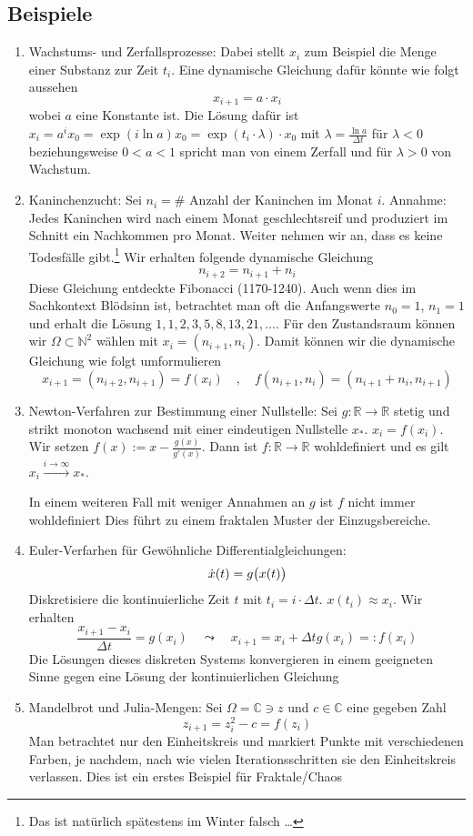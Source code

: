 \subsection*{Beispiele} %
\label{sub:beispiele}
\begin{enumerate}[(1)]
	\item Wachstums- und Zerfallsprozesse: Dabei stellt $x_i$ zum Beispiel die Menge einer Substanz zur Zeit $t_i$. Eine dynamische Gleichung dafür könnte wie folgt aussehen
	\[
		x_{i+1} = a \cdot x_i
	\]
	wobei $a$ eine Konstante ist. Die Lösung dafür ist $x_i = a^i x_0 = \exp(i \ln a) x_0 = \exp(t_i \cdot \lambda) \cdot x_0$ mit $\lambda= \frac{\ln a}{\Delta t}$ für 
	$\lambda <0$ beziehungsweise $0 < a < 1$ spricht man von einem Zerfall und für $\lambda>0$ von Wachstum.
	\item Kaninchenzucht: Sei $n_i = \#$ Anzahl der Kaninchen im Monat $i$. Annahme: Jedes Kaninchen wird nach einem Monat geschlechtsreif und produziert im Schnitt ein 
	Nachkommen pro Monat. Weiter nehmen wir an, dass es keine Todesfälle gibt.\footnote{Das ist natürlich spätestens im Winter falsch \ldots} Wir erhalten folgende 
	dynamische Gleichung
	\[
		n_{i+2} = n_{i+1} + n_i
	\]
	Diese Gleichung entdeckte Fibonacci (1170-1240). Auch wenn dies im Sachkontext Blödsinn ist, betrachtet man oft die Anfangswerte $n_0=1$, $n_1=1$ und erhalt die Lösung
	$1,1,2,3,5,8,13,21, \ldots $. Für den Zustandsraum können wir $\Omega \subset \mathds{N}^2$ wählen mit $x_i=(n_{i+1}, n_i)$. Damit können wir die dynamische Gleichung
	wie folgt umformulieren
	\[
		x_{i+1} = (n_{i+2}, n_{i+1}) = f(x_i) \quad , \quad f(n_{i+1}, n_i) = (n_{i+1} + n_i, n_{i+1})
	\]
	\item Newton-Verfahren zur Bestimmung einer Nullstelle: Sei $g \colon \mathds{R} \to \mathds{R}$ stetig und strikt monoton wachsend mit einer eindeutigen Nullstelle 
	$x_*$.
	$x_i =f(x_i)$. Wir setzen $f(x):= x- \frac{g(x)}{g'(x)}$. Dann ist $f \colon \mathds{R} \to \mathds{R}$ wohldefiniert und es gilt $x_i \xrightarrow{i \to \infty} x_*$.
	
	In einem weiteren Fall mit weniger Annahmen an $g$ ist $f$ nicht immer wohldefiniert
	Dies führt zu einem fraktalen Muster der Einzugsbereiche.
	\item Euler-Verfarhen für Gewöhnliche Differentialgleichungen: 
	\[
		\dot{x}(t) = g \enbrace[\big]{x(t)} 
	\]
	Diskretisiere die kontinuierliche Zeit $t$ mit $t_i = i \cdot \Delta t$. $x(t_i) \approx x_i$. Wir erhalten
	\[
		\frac{x_{i+1} -x_i}{\Delta t} = g(x_i) \quad \leadsto \quad x_{i+1} = x_i + \Delta t g(x_i) =: f(x_i)
	\]
	Die Lösungen dieses diskreten Systems konvergieren in einem geeigneten Sinne gegen eine Lösung der kontinuierlichen Gleichung
	\item Mandelbrot und Julia-Mengen: Sei $\Omega = \mathds{C} \ni z$ und $c \in \mathds{C}$ eine gegeben Zahl
	\[
		z_{i+1} = z_i^2 - c = f(z_i)
	\]
	Man betrachtet nur den Einheitskreis und markiert Punkte mit verschiedenen Farben, je nachdem, nach wie vielen Iterationsschritten sie den Einheitskreis verlassen.
	Dies ist ein erstes Beispiel für Fraktale/Chaos
\end{enumerate}

